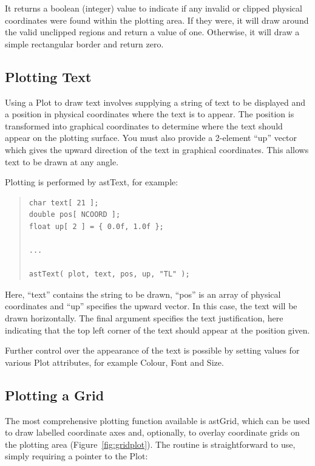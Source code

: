 \documentclass[twoside,11pt]{article}
\newcommand{\htmlref}[2]{#1}
\begin{document}
It returns a boolean (integer) value to indicate if any invalid or
clipped physical coordinates were found within the plotting area. If
they were, it will draw around the valid unclipped regions and return
a value of one.  Otherwise, it will draw a simple rectangular border
and return zero.

\subsection{Plotting Text}

Using a \htmlref{Plot}{Plot} to draw text involves supplying a string of text to be
displayed and a position in physical coordinates where the text is to
appear. The position is transformed into graphical coordinates to
determine where the text should appear on the plotting surface. You
must also provide a 2-element ``up'' vector which gives the upward
direction of the text in graphical coordinates. This allows text to be
drawn at any angle.

Plotting is performed by \htmlref{astText}{astText}, for example:

\begin{quote}
\small
\begin{verbatim}
char text[ 21 ];
double pos[ NCOORD ];
float up[ 2 ] = { 0.0f, 1.0f };

...

astText( plot, text, pos, up, "TL" );
\end{verbatim}
\normalsize
\end{quote}

Here, ``text'' contains the string to be drawn, ``pos'' is an array of
physical coordinates and ``up'' specifies the upward vector. In this
case, the text will be drawn horizontally. The final argument
specifies the text justification, here indicating that the top left
corner of the text should appear at the position given.

Further control over the appearance of the text is possible by setting
values for various Plot attributes, for example Colour, Font and Size.

\subsection{\label{ss:plottingagrid}Plotting a Grid}

The most comprehensive plotting function available is \htmlref{astGrid}{astGrid}, which
can be used to draw labelled coordinate axes and, optionally, to
overlay coordinate grids on the plotting area
(Figure~\ref{fig:gridplot}). The routine is straightforward to use,
simply requiring a pointer to the \htmlref{Plot}{Plot}:
\end{document}

